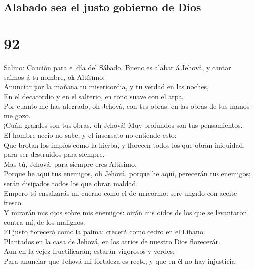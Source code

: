 \hypertarget{alabado-sea-el-justo-gobierno-de-dios}{%
\subsection{Alabado sea el justo gobierno de
Dios}\label{alabado-sea-el-justo-gobierno-de-dios}}

\hypertarget{section-19-92}{%
\section{92}\label{section-19-92}}

 Salmo: Canción para el día del Sábado. Bueno es alabar á
Jehová, y cantar salmos á tu nombre, oh Altísimo;\\
 Anunciar por la mañana tu misericordia, y tu verdad en
las noches,\\
 En el decacordio y en el salterio, en tono suave con el
arpa.\\
 Por cuanto me has alegrado, oh Jehová, con tus obras; en
las obras de tus manos me gozo.\\
 ¡Cuán grandes son tus obras, oh Jehová! Muy profundos son
tus pensamientos.\\
 El hombre necio no sabe, y el insensato no entiende
esto:\\
 Que brotan los impíos como la hierba, y florecen todos
los que obran iniquidad, para ser destruídos para siempre.\\
 Mas tú, Jehová, para siempre eres Altísimo.\\
 Porque he aquí tus enemigos, oh Jehová, porque he aquí,
perecerán tus enemigos; serán disipados todos los que obran maldad.\\
 Empero tú ensalzarás mi cuerno como el de unicornio:
seré ungido con aceite fresco.\\
 Y mirarán mis ojos sobre mis enemigos: oirán mis oídos
de los que se levantaron contra mí, de los malignos.\\
 El justo florecerá como la palma: crecerá como cedro en
el Líbano.\\
 Plantados en la casa de Jehová, en los atrios de nuestro
Dios florecerán.\\
 Aun en la vejez fructificarán; estarán vigorosos y
verdes;\\
 Para anunciar que Jehová mi fortaleza es recto, y que en
él no hay injusticia.


